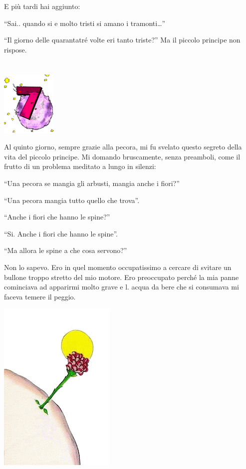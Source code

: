 \documentclass[11pt]{scrbook}
\begin{document}
E più tardi hai aggiunto:

``Sai.. quando si e molto tristi si amano i tramonti\ldots{}''

``Il giorno delle quarantatré volte eri tanto triste?'' Ma il piccolo
principe non rispose.

\chapter{}
\begin{center}
\includegraphics{img/chapter7}
\end{center}

Al quinto giorno, sempre grazie alla pecora, mi fu svelato questo
segreto della vita del piccolo principe. Mi domando bruscamente, senza
preamboli, come il frutto di un problema meditato a lungo in silenzi:

``Una pecora se mangia gli arbusti, mangia anche i fiori?''

``Una pecora mangia tutto quello che trova''.

``Anche i fiori che hanno le spine?''

``Si. Anche i fiori che hanno le spine''.

``Ma allora le spine a che cosa servono?''

Non lo sapevo. Ero in quel momento occupatissimo a cercare di svitare un
bullone troppo stretto del mio motore. Ero preoccupato perché la mia
panne cominciava ad apparirmi molto grave e l. acqua da bere che si
consumava mi faceva temere il peggio.

\begin{center}
\includegraphics{img/7a}

\end{center}
\end{document}
